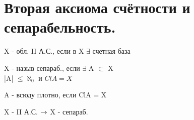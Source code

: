\documentclass[geometry.tex]{subfiles}
\begin{document}
  \section{Вторая аксиома счётности и сепарабельность.}

  \begin{definition}
      X - обл. II А.С., если в X $\exists$ счетная база
  \end{definition}

  \begin{definition}
      X - назыв сепараб., если $\exists$ A $\subset$ X\\
      |A| $\leq \aleph_0$ и $Cl A = X$
  \end{definition}

  \begin{definition}
      A - всюду плотно, если ClA = X
  \end{definition}

  \begin{theorem}
      X - II А.С. $\rightarrow$ X - сепараб.
  \end{theorem}
\end{document}
